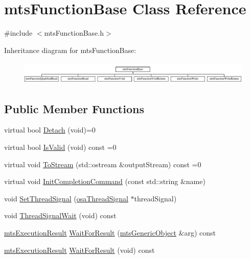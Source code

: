 \hypertarget{classmts_function_base}{\section{mts\-Function\-Base Class Reference}
\label{classmts_function_base}
}


{\ttfamily \#include $<$mts\-Function\-Base.\-h$>$}

Inheritance diagram for mts\-Function\-Base\-:\begin{figure}[H]
\begin{center}
\leavevmode
\includegraphics[height=1.117764cm]{d9/d3d/classmts_function_base}
\end{center}
\end{figure}
\subsection*{Public Member Functions}
\begin{DoxyCompactItemize}
\item 
virtual bool \hyperlink{classmts_function_base_a92dd688c12afb4771318b8ed29aa9c07}{Detach} (void)=0
\item 
virtual bool \hyperlink{classmts_function_base_ac0bea342090b03346b58232eb5f9f5d8}{Is\-Valid} (void) const =0
\item 
virtual void \hyperlink{classmts_function_base_ae6e5497be34d5563f2df3cb24d68e959}{To\-Stream} (std\-::ostream \&output\-Stream) const =0
\item 
virtual void \hyperlink{classmts_function_base_a77240cbe7459e0fea4b1eb4c7f9a53ad}{Init\-Completion\-Command} (const std\-::string \&name)
\item 
void \hyperlink{classmts_function_base_acf5a46f51a63801aa3da6c4fb4497f49}{Set\-Thread\-Signal} (\hyperlink{classosa_thread_signal}{osa\-Thread\-Signal} $\ast$thread\-Signal)
\item 
void \hyperlink{classmts_function_base_ab8e3e4767f9036a4950fba809530756a}{Thread\-Signal\-Wait} (void) const 
\item 
\hyperlink{classmts_execution_result}{mts\-Execution\-Result} \hyperlink{classmts_function_base_a37ccde77fd39ec754fb6bb57635c0fed}{Wait\-For\-Result} (\hyperlink{classmts_generic_object}{mts\-Generic\-Object} \&arg) const 
\item 
\hyperlink{classmts_execution_result}{mts\-Execution\-Result} \hyperlink{classmts_function_base_a27daf6336f69e18f79f292ac8b73376c}{Wait\-For\-Result} (void) const 
\end{DoxyCompactItemize}
